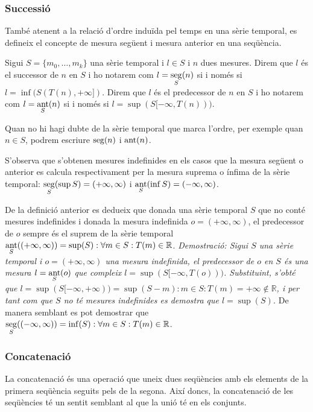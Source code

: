 \subsubsection{Successió}

També atenent a la relació d'ordre induïda pel temps en una sèrie temporal, es
defineix el concepte de mesura següent i mesura anterior en una
seqüència.


\begin{definition}\label{def:sgst:seg}\label{def:sgst:ant}
  Sigui $S=\{m_0, \ldots, m_k\}$ una sèrie temporal i $l\in S$ i $n$ dues
  mesures. Direm que $l$ és el successor de $n$ en $S$ i ho notarem
  com $l=\operatorname*{seg}\limits_S(n)$ si i només si $l=\inf(S(T(n),+\infty])$.
  Direm que $l$ és el predecessor de $n$ en $S$ i ho notarem com
  $l=\operatorname*{ant}\limits_S(n)$ si i només si $l=\sup(S[-\infty,T(n)))$.

Quan no hi hagi dubte de la sèrie temporal que marca l'ordre, per
exemple quan $n\in S$, podrem escriure $\operatorname*{seg}(n)$ i $\operatorname*{ant}(n)$.
\end{definition}

S'observa que s'obtenen mesures indefinides en els casos que la
mesura següent o anterior es calcula respectivament per la mesura
suprema o ínfima de la sèrie temporal: $\operatorname*{seg}\limits_S(\sup
S)=(+\infty,\infty)$ i $\operatorname*{ant}\limits_S(\inf S)=(-\infty,\infty)$.

De la definició anterior es dedueix que donada una sèrie temporal $S$
que no conté mesures indefinides i donada la mesura indefinida
$o=(+\infty,\infty)$, el predecessor de $o$ sempre és el suprem de la
sèrie temporal $\operatorname*{ant}\limits_S( (+\infty,\infty) ) = \sup(S): \forall
m\in S: T(m)\in\mathbb{R}$.  %
\emph{Demostració: Sigui $S$ una sèrie temporal i $o=(+\infty,\infty)$
  una mesura indefinida, el predecessor de $o$ en $S$ és una mesura
  $l=\operatorname*{ant}\limits_S(o)$ que compleix
  $l=\sup(S[-\infty,T(o)))$. Substituint, s'obté que
  $l=\sup(S[-\infty,+\infty))=\sup(S-m):m\in S:T(m)=+\infty \notin
  \mathbb{R}$, i per tant com que $S$ no té mesures indefinides es
  demostra que $l=\sup(S)$.  } De manera semblant es pot demostrar que
$\operatorname*{seg}\limits_S( (-\infty,\infty) ) = \inf(S): \forall m\in S:
T(m)\in\mathbb{R}$.


\subsubsection{Concatenació}

La concatenació és una operació que uneix dues seqüències amb els
elements de la primera seqüència seguits pels de la segona. Així
doncs, la concatenació de les seqüències té un sentit semblant al que
la unió té en els conjunts. 

